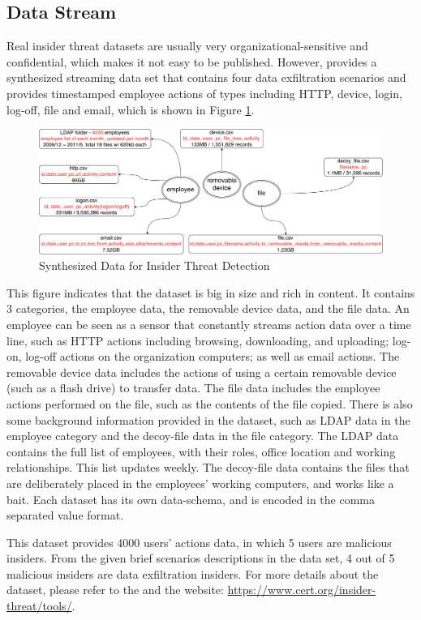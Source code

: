 \subsection{Data Stream}
Real insider threat datasets are usually very organizational-sensitive and confidential, which makes it not easy to be published. 
However, \cite{glasser2013bridging} provides a synthesized streaming data set that contains four data exfiltration scenarios and provides timestamped employee actions of types including HTTP, device, login, log-off, file and email, which is shown in Figure \ref{fig:dxd}.

\begin{figure}[!htbp]
	\centering
    \includegraphics[width=5in]{img/5-dxd.pdf}
    \caption{Synthesized Data for Insider Threat Detection}
    \label{fig:dxd}
\end{figure}

This figure indicates that the dataset is big in size and rich in content. 
It contains 3 categories, the employee data, the removable device data, and the file data. 
An employee can be seen as a sensor that constantly streams action data over a time line, such as HTTP actions including browsing, downloading, and uploading; 
log-on, log-off actions on the organization computers; as well as email actions.
The removable device data includes the actions of using a certain removable device (such as a flash drive) to transfer data.
The file data includes the employee actions performed on the file, such as the contents of the file copied.
There is also some background information provided in the dataset, such as LDAP data in the employee category and the decoy-file data in the file category. 
The LDAP data contains the full list of employees, with their roles, office location and working relationships. 
This list updates weekly. 
The decoy-file data contains the files that are deliberately placed in the employees' working computers, and works like a bait. 
Each dataset has its own data-schema, and is encoded in the comma separated value format.

This dataset provides 4000 users' actions data, in which 5 users are malicious insiders. 
From the given brief scenarios descriptions in the data set, 4 out of 5 malicious insiders are data exfiltration insiders. 
For more details about the dataset, please refer to the \cite{glasser2013bridging} and the website: \url{https://www.cert.org/insider-threat/tools/}.
%
